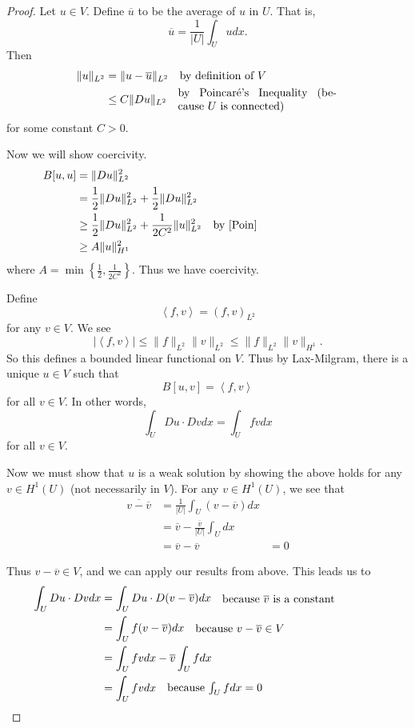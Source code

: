 \documentclass[a4paper]{article}
\newcommand{\la}{\left \langle}
\newcommand{\ra}{\right \rangle}
\begin{document}
\begin{enumerate}
\begin{proof}
      Let $u \in V$. Define $\overline{u}$ to be the average of $u$ in $U$. That is, 
      \[ \overline{u} = \frac{1}{|U|} \int_{U}^{} u dx .\]
      Then
      \begin{align}
	\|u\|_{L^2} &= \|u - \overline{u} \|_{L^2} \quad \parbox{5cm}{by definition of $V$} \nonumber \\
	&\leq C \|Du\|_{L^2} \quad \parbox{5cm}{by Poincar\a'e's Inequality (because $U$ is connected)} \label{Poin}
      \end{align}
      for some constant $C>0$.

      Now we will show coercivity.
      \begin{align*}
	B[u,u] &= \|Du\|_{L^2}^2 \\
	&= \frac{1}{2} \|Du\|_{L^2}^2 + \frac{1}{2} \|Du\|_{L^2}^2 \\
	&\geq \frac{1}{2} \|Du\|_{L^2}^2 + \frac{1}{2C^2}\|u\|_{L^2}^2 \quad \parbox{5cm}{by \eqref{Poin}} \\
	&\geq A \|u\|_{H^1}^2
      \end{align*}
      where $A = \min \left\{ \frac{1}{2}, \frac{1}{2C^2} \right\}$. Thus we have coercivity.

      Define
      \[ \la f, v \ra = (f,v)_{L^2} \]
      for any $v \in V$. We see
      \[ | \la f, v \ra | \leq \|f\|_{L^2} \|v\|_{L^2} \leq \|f\|_{L^2} \|v\|_{H^1} .\]
      So this defines a bounded linear functional on $V$. Thus by Lax-Milgram, there is a unique $u \in V$ such that
      \[ B[u,v] = \la f, v \ra \]
      for all $v \in V$. In other words,
      \[ \int_{U}^{} Du \cdot Dv dx = \int_{U}^{} fv dx \]
      for all $v \in V$.

      Now we must show that $u$ is a weak solution by showing the above holds for any $v \in H^1(U)$ (not necessarily in $V$).
      For any $v \in H^1(U)$, we see that 
      \begin{align*}
	\overline{v - \overline{v}} &= \frac{1}{|U|} \int_{U}^{} (v - \overline{v})dx \\
	&= \overline{v} - \frac{\overline{v}}{|U|} \int_{U}^{} dx \\
	&= \overline{v} - \overline{v}
	&= 0
      \end{align*}

      Thus $v - \overline{v} \in V$, and we can apply our results from above. This leads us to
      \begin{align*}
	\int_{U}^{} Du \cdot Dv dx &= \int_{U}^{} Du \cdot D(v-\overline{v}) dx \quad \parbox{5cm}{because $\overline{v}$ is a constant} \\
	&= \int_{U}^{} f (v - \overline{v}) dx \quad \parbox{5cm}{because $v - \overline{v} \in V$} \\
	&= \int_{U}^{} fv dx - \overline{v} \int_{U}^{} f dx \\
	&= \int_{U}^{} fv dx \quad \parbox{5cm}{because $\int_{U}^{} f dx = 0$}
      \end{align*}


\end{proof}
\end{enumerate}
\end{document}
